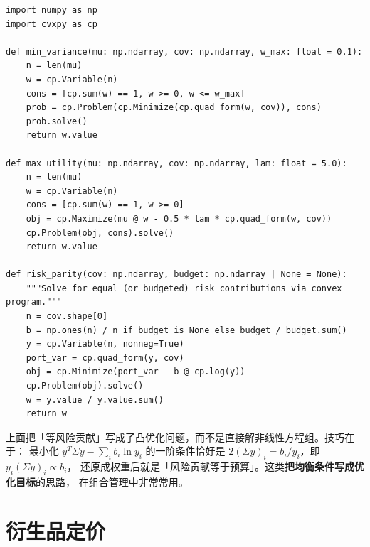 \begin{lstlisting}[style=pythonstyle,
  caption={用 cvxpy 求解带约束的均值--方差与等风险贡献组合},
  label={lst:opt}]
import numpy as np
import cvxpy as cp

def min_variance(mu: np.ndarray, cov: np.ndarray, w_max: float = 0.1):
    n = len(mu)
    w = cp.Variable(n)
    cons = [cp.sum(w) == 1, w >= 0, w <= w_max]
    prob = cp.Problem(cp.Minimize(cp.quad_form(w, cov)), cons)
    prob.solve()
    return w.value

def max_utility(mu: np.ndarray, cov: np.ndarray, lam: float = 5.0):
    n = len(mu)
    w = cp.Variable(n)
    cons = [cp.sum(w) == 1, w >= 0]
    obj = cp.Maximize(mu @ w - 0.5 * lam * cp.quad_form(w, cov))
    cp.Problem(obj, cons).solve()
    return w.value

def risk_parity(cov: np.ndarray, budget: np.ndarray | None = None):
    """Solve for equal (or budgeted) risk contributions via convex program."""
    n = cov.shape[0]
    b = np.ones(n) / n if budget is None else budget / budget.sum()
    y = cp.Variable(n, nonneg=True)
    port_var = cp.quad_form(y, cov)
    obj = cp.Minimize(port_var - b @ cp.log(y))
    cp.Problem(obj).solve()
    w = y.value / y.value.sum()
    return w
\end{lstlisting}

\begin{intuitionbox}[风险平价的建模技巧]
上面把「等风险贡献」写成了凸优化问题，而不是直接解非线性方程组。技巧在于：
最小化 $y^T\Sigma y - \sum_i b_i\ln y_i$ 的一阶条件恰好是
$2(\Sigma y)_i = b_i/y_i$，即 $y_i(\Sigma y)_i \propto b_i$，
还原成权重后就是「风险贡献等于预算」。这类\textbf{把均衡条件写成优化目标}的思路，
在组合管理中非常常用。
\end{intuitionbox}

\section{衍生品定价}

